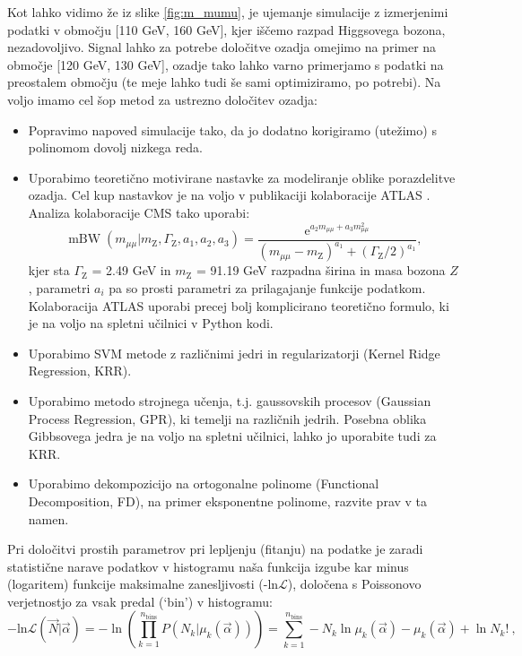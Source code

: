 \documentclass[slovene,11pt,a4paper]{article}
\newcommand{\logl}{\ensuremath{\mathrm{ln}\mathcal{L}\!}}
\begin{document}
Kot lahko vidimo že iz slike \ref{fig:m_mumu}, je ujemanje simulacije z izmerjenimi podatki v območju [110 GeV, 160 GeV], kjer iščemo razpad Higgsovega bozona, nezadovoljivo. Signal lahko za potrebe določitve ozadja omejimo na primer na območje [120 GeV, 130 GeV], ozadje tako lahko varno primerjamo s podatki na preostalem območju (te meje lahko tudi še sami optimiziramo, po potrebi). Na voljo imamo cel šop metod za ustrezno določitev ozadja:
\begin{itemize}
\item Popravimo napoved simulacije tako, da jo dodatno korigiramo (utežimo) s polinomom dovolj nizkega reda.
\item Uporabimo teoretično motivirane nastavke za modeliranje oblike porazdelitve ozadja. Cel kup nastavkov je na voljo v publikaciji kolaboracije ATLAS \cite{atlas-bkg}. Analiza kolaboracije CMS tako uporabi: 
\begin{equation*}
\operatorname{mBW}\left(m_{\mu \mu} | m_\mathrm{Z}, \Gamma_\mathrm{Z}, a_{1}, a_{2}, a_{3}\right)=\frac{\mathrm{e}^{a_{2} m_{\mu \mu}+a_{3} m_{\mu \mu}^{2}}}{\left(m_{\mu \mu}-m_{\mathrm{Z}}\right)^{a_{1}}+\left(\Gamma_{\mathrm{Z}} / 2\right)^{a_{1}}},
\end{equation*}
kjer sta $\Gamma_\mathrm{Z}$ = 2.49 GeV in $m_\mathrm{Z}$ = 91.19 GeV razpadna širina in masa bozona $Z$, parametri $a_{i}$ pa so prosti parametri za prilagajanje funkcije podatkom. Kolaboracija ATLAS uporabi precej bolj komplicirano teoretično formulo, ki je na voljo na spletni učilnici v Python kodi.
\item Uporabimo SVM metode z različnimi jedri in regularizatorji (Kernel Ridge Regression, KRR).
\item Uporabimo metodo strojnega učenja, t.j. gaussovskih procesov (Gaussian Process Regression, GPR), ki temelji na različnih jedrih. Posebna oblika Gibbsovega jedra je na voljo na spletni učilnici, lahko jo uporabite tudi za KRR. 
\item Uporabimo dekompozicijo na ortogonalne polinome (Functional Decomposition, FD), na primer eksponentne polinome, razvite prav v ta namen\cite{FD-regression}.
\end{itemize}
Pri določitvi prostih parametrov pri lepljenju (fitanju) na podatke je zaradi statistične narave podatkov v histogramu naša funkcija izgube kar minus (logaritem) funkcije maksimalne zanesljivosti (-\logl ), določena s Poissonovo verjetnostjo za vsak predal (`bin') v histogramu:
\begin{equation}
-\logl(\vec{N}|\vec{\alpha}) = -\ln\left(\prod\limits_{k=1}^{n_\mathrm{bins}} P(N_k|\mu_k(\vec{\alpha}))\right) = \sum\limits_{k=1}^{n_\mathrm{bins}} -N_k\ln\mu_k(\vec{\alpha})-\mu_k(\vec{\alpha})+\ln N_k! ~, 
\end{equation}
\end{document}
